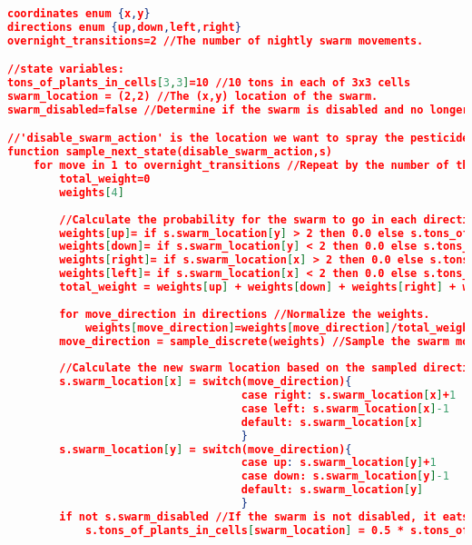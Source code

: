 


\DeclareCaptionFormat{}{\hrule}{}
\captionsetup[lstlisting]{labelfont=bf,singlelinecheck=off,labelsep=space}{}
\begin{lstlisting}[floatplacement=h,numbersymbol=$:$,language=json,caption={The Locusts Swarm domain in pseudo PPL code.},label={lst:LocustsDomain_PPL},basicstyle=\tiny] 
coordinates enum {x,y}
directions enum {up,down,left,right}
overnight_transitions=2 //The number of nightly swarm movements.

//state variables:
tons_of_plants_in_cells[3,3]=10 //10 tons in each of 3x3 cells
swarm_location = (2,2) //The (x,y) location of the swarm.
swarm_disabled=false //Determine if the swarm is disabled and no longer damages the plants.

//'disable_swarm_action' is the location we want to spray the pesticides. 's' is the state we want to sample from. 
function sample_next_state(disable_swarm_action,s)
    for move in 1 to overnight_transitions //Repeat by the number of the swarm nightly transitions.
        total_weight=0	
        weights[4]
        
        //Calculate the probability for the swarm to go in each direction based on the amounts of plants there. 
        weights[up]= if s.swarm_location[y] > 2 then 0.0 else s.tons_of_plants_in_cells[s.swarm_location[x],s.swarm_location[y]+1]
        weights[down]= if s.swarm_location[y] < 2 then 0.0 else s.tons_of_plants_in_cells[s.swarm_location[x],s.swarm_location[y]-1]
        weights[right]= if s.swarm_location[x] > 2 then 0.0 else s.tons_of_plants_in_cells[s.swarm_location[x]+1],s.swarm_location[y]]
        weights[left]= if s.swarm_location[x] < 2 then 0.0 else s.tons_of_plants_in_cells[s.swarm_location[x]-1],s.swarm_location[y]]
        total_weight = weights[up] + weights[down] + weights[right] + weights[left]
        
        for move_direction in directions //Normalize the weights.
            weights[move_direction]=weights[move_direction]/total_weight
        move_direction = sample_discrete(weights) //Sample the swarm movement direction.
        
        //Calculate the new swarm location based on the sampled direction.
        s.swarm_location[x] = switch(move_direction){
                                    case right: s.swarm_location[x]+1
                                    case left: s.swarm_location[x]-1
                                    default: s.swarm_location[x]
                                    }
        s.swarm_location[y] = switch(move_direction){
                                    case up: s.swarm_location[y]+1
                                    case down: s.swarm_location[y]-1
                                    default: s.swarm_location[y]
                                    }
        if not s.swarm_disabled //If the swarm is not disabled, it eats half the food in its current location.
            s.tons_of_plants_in_cells[swarm_location] = 0.5 * s.tons_of_plants_in_cells[swarm_location]
            

\end{lstlisting}
